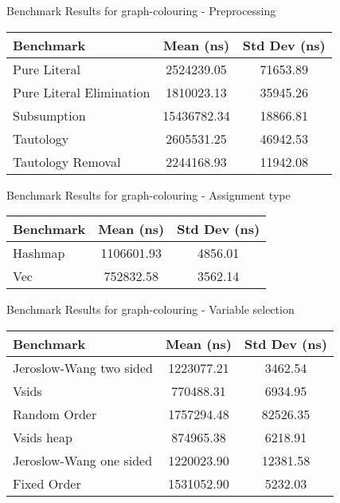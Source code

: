 \begin{cmptable}[h]{Benchmark Results for graph-colouring - Preprocessing\label{tab:bench-graph-colouring---Preprocessing}}
    \begin{tabular}{|l|c|c|}
        \hline
        Benchmark & Mean (ns) & Std Dev (ns) \\
        \hline
        Pure Literal & 2524239.05 & 71653.89 \\
        Pure Literal Elimination & 1810023.13 & 35945.26 \\
        Subsumption & 15436782.34 & 18866.81 \\
        Tautology & 2605531.25 & 46942.53 \\
        Tautology Removal & 2244168.93 & 11942.08 \\
        \hline
    \end{tabular}
\end{cmptable}


\begin{cmptable}[h]{Benchmark Results for graph-colouring - Assignment type\label{tab:bench-graph-colouring---Assignment-type}}
    \begin{tabular}{|l|c|c|}
        \hline
        Benchmark & Mean (ns) & Std Dev (ns) \\
        \hline
        Hashmap & 1106601.93 & 4856.01 \\
        Vec & 752832.58 & 3562.14 \\
        \hline
    \end{tabular}
\end{cmptable}


\begin{cmptable}[h]{Benchmark Results for graph-colouring - Variable selection\label{tab:bench-graph-colouring---Variable-selection}}
    \begin{tabular}{|l|c|c|}
        \hline
        Benchmark & Mean (ns) & Std Dev (ns) \\
        \hline
        Jeroslow-Wang two sided & 1223077.21 & 3462.54 \\
        Vsids & 770488.31 & 6934.95 \\
        Random Order & 1757294.48 & 82526.35 \\
        Vsids heap & 874965.38 & 6218.91 \\
        Jeroslow-Wang one sided & 1220023.90 & 12381.58 \\
        Fixed Order & 1531052.90 & 5232.03 \\
        \hline
    \end{tabular}
\end{cmptable}


